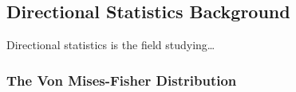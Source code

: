 \subsection{Directional Statistics Background}

Directional statistics is the field studying\dots

\subsubsection{The Von Mises-Fisher Distribution}